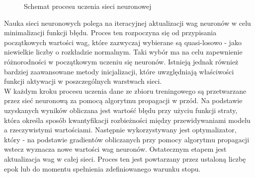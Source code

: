 \documentclass[a4paper,twoside,12pt]{book}
\begin{document}
\begin{figure}[h!]
	\centering
	\caption{Schemat procesu uczenia sieci neuronowej}
\end{figure}

Nauka sieci neuronowych polega na iteracyjnej aktualizacji wag neuronów w celu minimalizacji funkcji błędu. Proces ten rozpoczyna się od przypisania początkowych wartości wag, które zazwyczaj wybierane są quasi-losowo - jako niewielkie liczby o rozkładzie normalnym. Taki wybór ma na celu zapewnienie różnorodności w początkowym uczeniu się neuronów. Istnieją jednak również bardziej zaawansowane metody inicjalizacji, które uwzględniają właściwości funkcji aktywacji w poszczególnych warstwach sieci.\\
W każdym kroku procesu uczenia dane ze zbioru treningowego są przetwarzane przez sieć neuronową za pomocą algorytmu propagacji w przód. Na podstawie uzyskanych wyników obliczana jest wartość błędu przy użyciu funkcji straty, która określa sposób kwantyfikacji rozbieżności między przewidywaniami modelu a rzeczywistymi wartościami. Następnie wykorzystywany jest optymalizator, który - na podstawie gradientów obliczanych przy pomocy algorytmu propagacji wstecz wyznacza nowe wartości wag neuronów. Ostatecznym etapem jest aktualizacja wag w całej sieci. Proces ten jest powtarzany przez ustaloną liczbę epok lub do momentu spełnienia zdefiniowanego warunku stopu.
\end{document}
